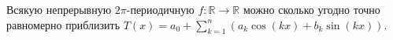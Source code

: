
\begin{to_thr}
    Всякую непрерывную $2\pi$-периодичную $f \colon \mathbb{R} \to \mathbb{R}$ можно сколько угодно точно равномерно приблизить $T(x) = a_0 + \sum\limits_{k = 1}^{n}(a_k \cos(k x) + b_k \sin(k x)) $.
\end{to_thr}
